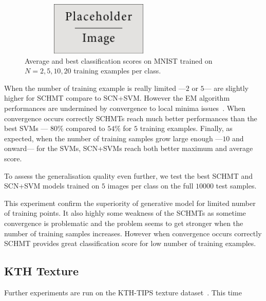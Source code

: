 \documentclass{article}
\begin{document}
		\begin{figure}
			\begin{center}
				\includegraphics[width=3in, height= 1in]{placeholder.jpg}
			  \caption[MNIST: classification scores]{\centered Average and best classification scores on MNIST trained on $N=2,5,10,20$ training examples per class.}
			  \label{fig:SCHMT MNIST}
			\end{center}
			\vspace{-20pt}
		\end{figure}
		When the number of training example is really limited ---\ie $2$ or $5$--- are slightly higher for SCHMT compare to SCN+SVM. However the EM algorithm performances are undermined by convergence to local minima issues~\citep{The expectation-maximization algorithm, Moon TK}. When convergence occurs correctly SCHMTs reach much better performances than the best SVMs --- $80\%$ compared to $54\%$ for $5$ training examples. Finally, as expected, when the number of training samples grow large enough ---\ie $10$ and onward--- for the SVMs, SCN+SVMs reach both better maximum and average score.
		
		To assess the generalisation quality even further, we test the best SCHMT and SCN+SVM models trained on $5$ images per class on the full $10000$ test samples. %
		
		This experiment confirm the superiority of generative model for limited number of training points. It also highly some weakness of the SCHMTs as sometime convergence is problematic and the problem seems to get stronger when the number of training samples increases. However when convergence occurs correctly SCHMT provides great classification score for low number of training examples.
		
	\subsection{KTH Texture}
		\label{subsec:Exps/KTH Texture}
		
		Further experiments are run on the KTH-TIPS texture dataset~\citep{kth-tips}. This time 
		
\end{document}
